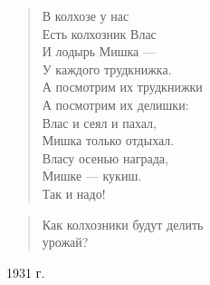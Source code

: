 \begin{verse}
В колхозе у нас\\
Есть колхозник Влас\\
И лодырь Мишка ---\\
У каждого трудкнижка.\\
А посмотрим их трудкнижки\\
А посмотрим их делишки:\\
Влас и сеял и пахал,\\
Мишка только отдыхал.\\
Власу осенью награда,\\
Мишке --- кукиш.\\
Так и надо!
\end{verse}

\begin{verse}
Как колхозники будут делить\\
урожай?
\end{verse}

\begin{flushright}
1931 г.
\end{flushright}
